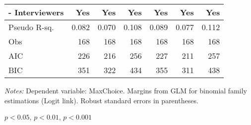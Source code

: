 \begin{table}[htbp]
\begin{adjustbox}{width=1\textwidth}
\begin{threeparttable}
\begin{tabular}{l*{6}{D{.}{.}{-1}}}
- Interviewers        &                 Yes   &                 Yes   &                 Yes   &                 Yes   &                 Yes   &                 Yes   \\
\midrule
Pseudo R-sq.  &  0.082	     &      0.070               &   0.108 &      	0.089             &     0.077                  &        0.112               \\
Obs                 &                 168   &                 168   &                 168   &                 168   &                 168   &                 168   \\
AIC                 &                 226   &                 216   &                 256   &                 227   &                 211   &                 257   \\
BIC                 &                 351   &                 322   &                 434   &                 355   &                 311   &                 438   \\
\bottomrule
\end{tabular}
\begin{tablenotes}
\footnotesize
\item \textit{Notes:} Dependent variable: MaxChoice. Margins from GLM for binomial family estimations (Logit link). Robust standard errors in parentheses. \\
\item \sym{*} \(p<0.05\), \sym{**} \(p<0.01\), \sym{***} \(p<0.001\)
\end{tablenotes}
\end{threeparttable}
\end{adjustbox}
\label{tab:maxmath}
\end{table}

